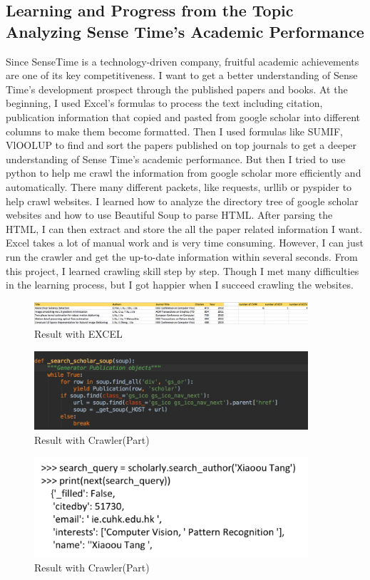\documentclass{article}
\begin{document}
\subsection{Learning and Progress from the Topic Analyzing Sense Time’s Academic Performance}
Since SenseTime is a technology-driven company, fruitful academic achievements are one of its key competitiveness. I want to get a better understanding of Sense Time’s development prospect through the published papers and books.  At the beginning, I used Excel’s formulas to process the text including citation, publication information that copied and pasted from google scholar into different columns to make them become formatted. Then I used formulas like SUMIF, VlOOLUP to find and sort the papers published on top journals to get a deeper understanding of Sense Time’s academic performance. But then I tried to use python to help me crawl the information from google scholar more efficiently and automatically. There many different packets, like requests, urllib or pyspider to help crawl websites. I learned how to analyze the directory tree of google scholar websites and how to use Beautiful Soup to parse HTML. After parsing the HTML, I can then extract and store the all the paper related information I want. Excel takes a lot of manual work and is very time consuming. However, I can just run the crawler and get the up-to-date information within several seconds. From this project, I learned crawling skill step by step. Though I met many difficulties in the learning process, but I got happier when I succeed crawling the websites.
\begin{figure}[htb]
    \centering
    \includegraphics[width=4in]{liu1.png}
  	\caption{Result with EXCEL}
\end{figure}
\begin{figure}[htb]
    \centering
    \includegraphics[width=4in]{liu2.png}
  	\caption{Result with Crawler(Part)}
\end{figure}
\begin{figure}[htb]
    \centering
    \includegraphics[width=4in]{liu3.png}
  	\caption{Result with Crawler(Part)}
\end{figure}
\end{document}
